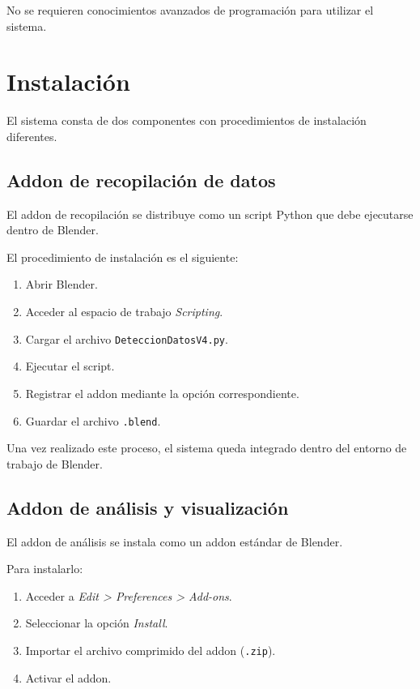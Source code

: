 No se requieren conocimientos avanzados de programación para utilizar el sistema.

\section{Instalación}

El sistema consta de dos componentes con procedimientos de instalación diferentes.

\subsection{Addon de recopilación de datos}

El addon de recopilación se distribuye como un script Python que debe ejecutarse dentro de Blender.

El procedimiento de instalación es el siguiente:

\begin{enumerate}
    \item Abrir Blender.
    \item Acceder al espacio de trabajo \textit{Scripting}.
    \item Cargar el archivo \texttt{DeteccionDatosV4.py}.
    \item Ejecutar el script.
    \item Registrar el addon mediante la opción correspondiente.
    \item Guardar el archivo \texttt{.blend}.
\end{enumerate}

Una vez realizado este proceso, el sistema queda integrado dentro del entorno de trabajo de Blender.

\subsection{Addon de análisis y visualización}

El addon de análisis se instala como un addon estándar de Blender.

Para instalarlo:

\begin{enumerate}
    \item Acceder a \textit{Edit > Preferences > Add-ons}.
    \item Seleccionar la opción \textit{Install}.
    \item Importar el archivo comprimido del addon (\texttt{.zip}).
    \item Activar el addon.
\end{enumerate}

